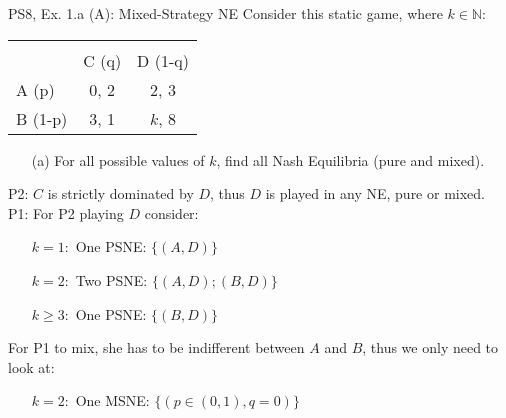 \begin{frame}{PS8, Ex. 1.a (A): Mixed-Strategy NE}
      Consider this static game, where $k\in\mathbb{N}:$
      \vspace{-16pt}
      \begin{table}
        \begin{tabular}{l|c|c|}
          \multicolumn{1}{c}{} & \multicolumn{2}{c}{} \\
          \multicolumn{1}{c}{} & \multicolumn{1}{c}{C (q)} & \multicolumn{1}{c}{\color{blue}D (1-q)} \\\cline{2-3}
          A (p)   & 0, 2 & 2, \color{blue}3 \\\cline{2-3}
          B (1-p) & 3, 1 & $k$, \color{blue}8 \\\cline{2-3}
        \end{tabular}
      \end{table}
      \begin{itemize}
        \item[(a)] For all possible values of $k$, find all Nash Equilibria (pure and mixed).
      \end{itemize}
      P2: $C$ is strictly dominated by $D$, thus $D$ is played in any NE, pure or mixed.\\\medskip
      P1: For P2 playing $D$ consider:
      \begin{itemize}
        \item[$k=1:$] One PSNE: $\{(A,D)\}$
        \item[$k=2:$] Two PSNE: $\{(A,D);(B,D)\}$
        \item[$k\geq3:$] One PSNE: $\{(B,D)\}$
      \end{itemize}
      For P1 to mix, she has to be indifferent between $A$ and $B$, thus we only need to look at:
      \begin{itemize}
        \item[$k=2:$] One MSNE: $\{(p\in(0,1),q=0)\}$
      \end{itemize}
      \vfill\null
\end{frame}

